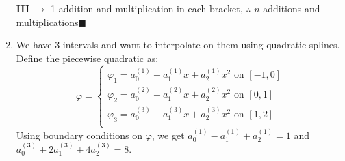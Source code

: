 \documentclass[a4paper, 11pt]{article}
\begin{document}
\begin{enumerate}[label=(\arabic*), leftmargin=*]
	\textbf{III} $\rightarrow$ 1 addition and multiplication in each bracket, $\therefore$ $n$ additions and multiplications\hfill$\blacksquare$
	\item We have 3 intervals and want to interpolate on them using quadratic splines. Define the piecewise quadratic as:
	$$\varphi=\left\lbrace \begin{array}{l}
		\varphi_1=a_0^{(1)}+a_1^{(1)}x+a_2^{(1)}x^2\text{ on }[-1,0]\\
		\varphi_2=a_0^{(2)}+a_1^{(2)}x+a_2^{(2)}x^2\text{ on }[0,1]\\
		\varphi_3=a_0^{(3)}+a_1^{(3)}x+a_2^{(3)}x^2\text{ on }[1,2]\\
	\end{array}\right.$$
	Using boundary conditions on $\varphi$, we get
	$a_0^{(1)}-a_1^{(1)}+a_2^{(1)}=1$ and $a_0^{(3)}+2a_1^{(3)}+4a_2^{(3)}=8$.
	

\end{enumerate}
\end{document}
